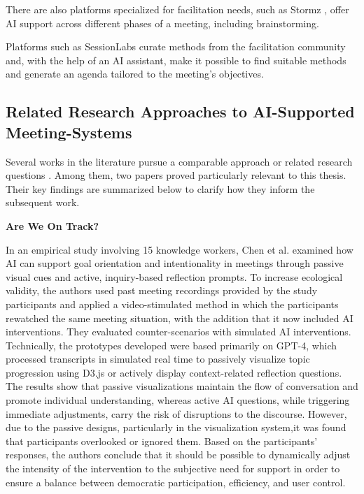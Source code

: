 There are also platforms specialized for facilitation needs, such as Stormz \cite{GetStartedStormz}, offer AI
support across different phases of a meeting, including brainstorming.
\cite{aitinkerersclubStormzAIFeature2023}

Platforms such as SessionLabs curate methods from the facilitation community and, with the help of an AI
assistant, make it possible to find suitable methods and generate an agenda tailored to the meeting's
objectives.\cite{sessionlabsDesignFasterAI2025}

\subsection{Related Research Approaches to AI-Supported Meeting-Systems}
\label{sec:research-approaches-to-ai-supported-meeting-systems}
Several works in the literature pursue a comparable approach or related research questions . Among them, two
papers proved particularly relevant to this thesis. Their key findings are summarized below to clarify how
they inform the subsequent work.

\textbf{Are We On Track?}

In an empirical study involving 15 knowledge workers, Chen et al. examined how AI can
support goal orientation and intentionality in meetings through passive visual cues and active, inquiry-based
reflection prompts. \cite[p. 1]{chenAreWeTrack2025}
To increase ecological validity, the authors used past meeting recordings provided by the study participants
and applied a video-stimulated method in which the participants
rewatched the same meeting situation, with the addition that it now included AI interventions.
They evaluated counter-scenarios with simulated AI interventions. \cite[p. 4]{chenAreWeTrack2025}
Technically, the prototypes developed were based primarily on GPT-4, which processed transcripts in simulated
real time to passively visualize topic progression using D3.js or actively display context-related reflection questions.
\cite[p. 6]{chenAreWeTrack2025}
The results show that passive visualizations maintain the flow of conversation and promote individual
understanding, whereas active AI questions, while triggering immediate adjustments, carry the risk of
disruptions to the discourse. \cite[p. 2]{chenAreWeTrack2025} However, due to the passive designs,
particularly in the visualization system,it was found that participants overlooked or ignored them. \cite[p.
2]{chenAreWeTrack2025}
Based on the participants’ responses, the authors conclude that it should be possible to
dynamically adjust the intensity of the intervention to the subjective need for support in order to ensure a
balance between
democratic participation, efficiency, and user control. \cite[p. 13]{chenAreWeTrack2025}

